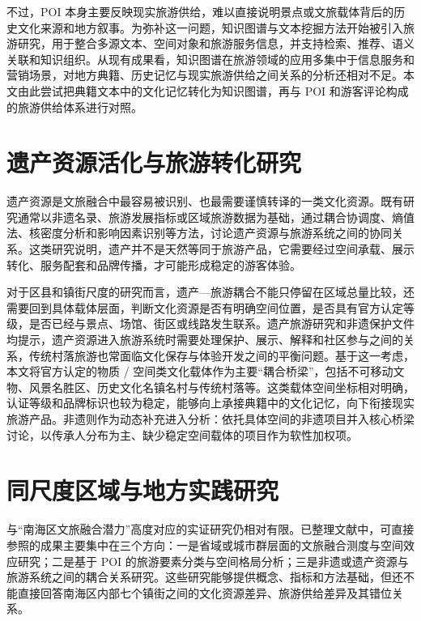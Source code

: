 不过，POI 本身主要反映现实旅游供给，难以直接说明景点或文旅载体背后的历史文化来源和地方叙事。为弥补这一问题，知识图谱与文本挖掘方法开始被引入旅游研究，用于整合多源文本、空间对象和旅游服务信息，并支持检索、推荐、语义关联和知识组织\cite{ref7,ref8,ref9,ref10}。从现有成果看，知识图谱在旅游领域的应用多集中于信息服务和营销场景，对地方典籍、历史记忆与现实旅游供给之间关系的分析还相对不足。本文由此尝试把典籍文本中的文化记忆转化为知识图谱，再与 POI 和游客评论构成的旅游供给体系进行对照。

\section{遗产资源活化与旅游转化研究}\label{ux9057ux4ea7ux8d44ux6e90ux6d3bux5316ux4e0eux65c5ux6e38ux8f6cux5316ux7814ux7a76}

遗产资源是文旅融合中最容易被识别、也最需要谨慎转译的一类文化资源。既有研究通常以非遗名录、旅游发展指标或区域旅游数据为基础，通过耦合协调度、熵值法、核密度分析和影响因素识别等方法，讨论遗产资源与旅游系统之间的协同关系\cite{ref5,ref6}。这类研究说明，遗产并不是天然等同于旅游产品，它需要经过空间承载、展示转化、服务配套和品牌传播，才可能形成稳定的游客体验。

对于区县和镇街尺度的研究而言，遗产---旅游耦合不能只停留在区域总量比较，还需要回到具体载体层面，判断文化资源是否有明确空间位置，是否具有官方认定等级，是否已经与景点、场馆、街区或线路发生联系。遗产旅游研究和非遗保护文件均提示，遗产资源进入旅游系统时需要处理保护、展示、解释和社区参与之间的关系，传统村落旅游也常面临文化保存与体验开发之间的平衡问题\cite{ref26,ref27,ref28}。基于这一考虑，本文将官方认定的物质 / 空间类文化载体作为主要``耦合桥梁''，包括不可移动文物、风景名胜区、历史文化名镇名村与传统村落等。这类载体空间坐标相对明确，认证等级和品牌标识也较为稳定，能够向上承接典籍中的文化记忆，向下衔接现实旅游产品。非遗则作为动态补充进入分析：依托具体空间的非遗项目并入核心桥梁讨论，以传承人分布为主、缺少稳定空间载体的项目作为软性加权项。

\section{同尺度区域与地方实践研究}\label{ux540cux5c3aux5ea6ux533aux57dfux4e0eux5730ux65b9ux5b9eux8df5ux7814ux7a76}

与``南海区文旅融合潜力''高度对应的实证研究仍相对有限。已整理文献中，可直接参照的成果主要集中在三个方向：一是省域或城市群层面的文旅融合测度与空间效应研究\cite{ref1,ref2,ref11,ref12,ref13,ref14,ref15,ref16,ref17,ref18}；二是基于 POI 的旅游要素分类与空间格局分析\cite{ref3,ref4}；三是非遗或遗产资源与旅游系统之间的耦合关系研究\cite{ref5,ref6}。这些研究能够提供概念、指标和方法基础，但还不能直接回答南海区内部七个镇街之间的文化资源差异、旅游供给差异及其错位关系。

